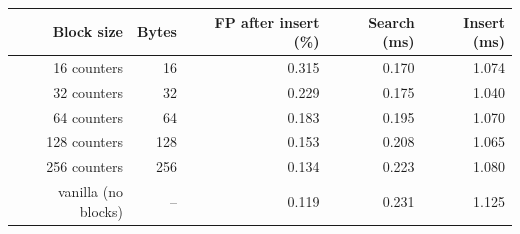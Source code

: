 \begin{tabular}{rrrrr}
\toprule
Block size & Bytes & FP after insert (\%) & Search (ms) & Insert (ms) \\
\midrule
16 counters & 16 & 0.315 & 0.170 & 1.074 \\
32 counters & 32 & 0.229 & 0.175 & 1.040 \\
64 counters & 64 & 0.183 & 0.195 & 1.070 \\
128 counters & 128 & 0.153 & 0.208 & 1.065 \\
256 counters & 256 & 0.134 & 0.223 & 1.080 \\
\midrule
vanilla (no blocks) & -- & 0.119 & 0.231 & 1.125 \\
\bottomrule
\end{tabular}